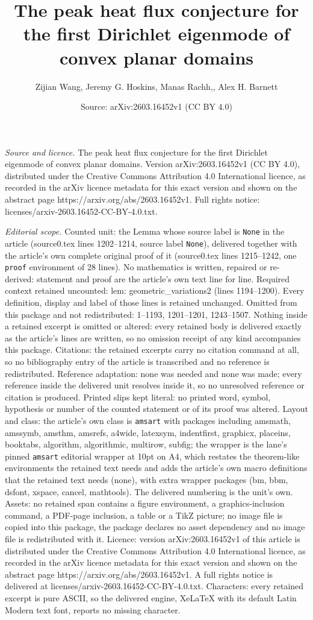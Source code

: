 \documentclass[10pt,a4paper]{amsart}
\title[The peak heat flux conjecture for the first Dirichlet eigenm]{The peak heat flux conjecture for the first Dirichlet eigenmode of convex planar domains}
\author{Zijian Wang, Jeremy G. Hoskins, Manas Rachh,, Alex H. Barnett}
\date{Source: arXiv:2603.16452v1 (CC BY 4.0)}
\begin{document}
\maketitle

\noindent\emph{Source and licence.} The peak heat flux conjecture for the first Dirichlet eigenmode of convex planar domains. Version arXiv:2603.16452v1 (CC BY 4.0), distributed under the Creative Commons Attribution 4.0 International licence, as recorded in the arXiv licence metadata for this exact version and shown on the abstract page https://arxiv.org/abs/2603.16452v1. Full rights notice: licenses/arxiv-2603.16452-CC-BY-4.0.txt.\par\smallskip

\noindent\textit{Editorial scope.} Counted unit: the Lemma whose source label is \texttt{None} in the article (source0.tex lines 1202--1214, source label \texttt{None}), delivered together with the article's own complete original proof of it (source0.tex lines 1215--1242, one \texttt{proof} environment of 28 lines). No mathematics is written, repaired or re-derived: statement and proof are the article's own text line for line. Required context retained uncounted: lem: geometric\_variations2 (lines 1194--1200). Every definition, display and label of those lines is retained unchanged. Omitted from this package and not redistributed: 1--1193, 1201--1201, 1243--1507. Nothing inside a retained excerpt is omitted or altered: every retained body is delivered exactly as the article's lines are written, so no omission receipt of any kind accompanies this package. Citations: the retained excerpts carry no citation command at all, so no bibliography entry of the article is transcribed and no reference is redistributed. Reference adaptation: none was needed and none was made; every reference inside the delivered unit resolves inside it, so no unresolved reference or citation is produced. Printed slips kept literal: no printed word, symbol, hypothesis or number of the counted statement or of its proof was altered. Layout and class: the article's own class is \texttt{amsart} with packages including amsmath, amssymb, amsthm, amsrefs, a4wide, latexsym, indentfirst, graphicx, placeins, booktabs, algorithm, algorithmic, multirow, subfig; the wrapper is the lane's pinned \texttt{amsart} editorial wrapper at 10pt on A4, which restates the theorem-like environments the retained text needs and adds the article's own macro definitions that the retained text needs (none), with extra wrapper packages (bm, bbm, dsfont, xspace, cancel, mathtools). The delivered numbering is the unit's own. Assets: no retained span contains a figure environment, a graphics-inclusion command, a PDF-page inclusion, a table or a TikZ picture; no image file is copied into this package, the package declares no asset dependency and no image file is redistributed with it. Licence: version arXiv:2603.16452v1 of this article is distributed under the Creative Commons Attribution 4.0 International licence, as recorded in the arXiv licence metadata for this exact version and shown on the abstract page https://arxiv.org/abs/2603.16452v1. A full rights notice is delivered at licenses/arxiv-2603.16452-CC-BY-4.0.txt. Characters: every retained excerpt is pure ASCII, so the delivered engine, XeLaTeX with its default Latin Modern text font, reports no missing character.
\end{document}

